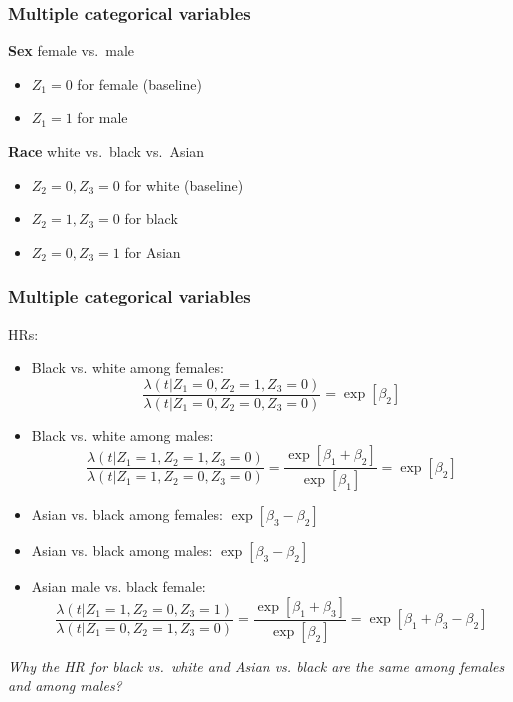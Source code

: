 \documentclass[11pt, aspectratio = 169]{beamer}
\begin{document}
\begin{frame}
  \frametitle{Multiple categorical variables}
  \textbf{Sex} female vs.\ male
  \begin{itemize}
    \item $Z_1 = 0$ for female (baseline)
    \item $Z_1 = 1$ for male
  \end{itemize}
  \textbf{Race} white vs.\ black vs.\ Asian
  \begin{itemize}
    \item $Z_2 = 0, Z_3 = 0$ for white (baseline)
    \item $Z_2 = 1, Z_3 = 0$ for black
    \item $Z_2 = 0, Z_3 = 1$ for Asian
  \end{itemize}
\end{frame}

\begin{frame}
  \frametitle{Multiple categorical variables}
  HRs:
  \begin{itemize}
    \item Black vs. white among females:
    \begin{equation*}
      \frac{\lambda(t|Z_1 = 0, Z_2 = 1, Z_3 = 0)}{\lambda(t|Z_1 = 0, Z_2 = 0, Z_3 = 0)} = \exp\left[\beta_2\right]
    \end{equation*}
    \item Black vs. white among males:
    \begin{equation*}
      \frac{\lambda(t|Z_1 = 1, Z_2 = 1, Z_3 = 0)}{\lambda(t|Z_1 = 1, Z_2 = 0, Z_3 = 0)} = \frac{\exp\left[\beta_1 + \beta_2\right]}{\exp\left[\beta_1\right]} = \exp\left[\beta_2\right]
    \end{equation*}
    \item Asian vs. black among females: $\exp\left[\beta_3 - \beta_2\right]$
    \item Asian vs. black among males: $\exp\left[\beta_3 - \beta_2\right]$
    \item Asian male vs. black female:
    \begin{equation*}
      \frac{\lambda(t|Z_1 = 1, Z_2 = 0, Z_3 = 1)}{\lambda(t|Z_1 = 0, Z_2 = 1, Z_3 = 0)} = \frac{\exp\left[\beta_1 + \beta_3\right]}{\exp\left[\beta_2\right]} = \exp\left[\beta_1 + \beta_3 - \beta_2\right]
    \end{equation*}
  \end{itemize}
  \textit{Why the HR for black vs.\ white and Asian vs. black are the same among females and among males?}
\end{frame}
\end{document}
